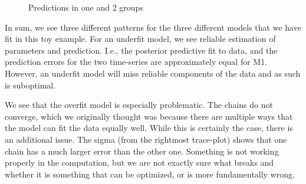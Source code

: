 \documentclass{article}
\begin{document}
\begin{figure}[H]
    \centering
    \quad
    \quad
    \caption{Predictions in one and 2 groups}
\end{figure}

In sum, we see three different patterns for the three different models that we have fit in this toy example. For an underfit model, we see reliable estimation of parameters and prediction. I.e., the posterior predictive fit to data, and the prediction errors for the two time-series are approximately equal for M1. However, an underfit model will miss reliable components of the data and as such is suboptimal. 

We see that the overfit model is especially problematic. The chains do not converge, which we originally thought was because there are multiple ways that the model can fit the data equally well. While this is certainly the case, there is an additional issue. The sigma (from the rightmost trace-plot) shows that one chain has a much larger error than the other one. Something is not working properly in the computation, but we are not exactly sure what breaks and whether it is something that can be optimized, or is more fundamentally wrong. 
\end{document}
